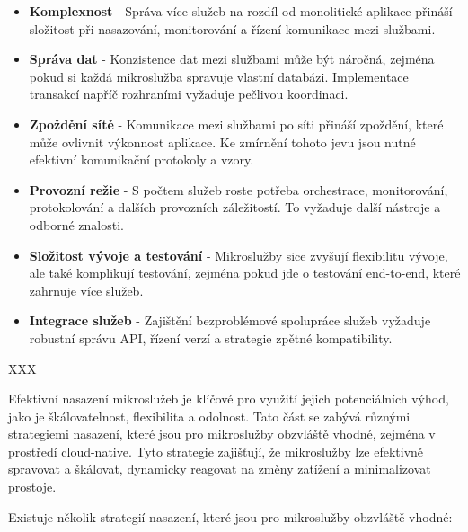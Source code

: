 \begin{itemize}

\item \textbf{Komplexnost} - Správa více služeb na rozdíl od monolitické aplikace přináší složitost při nasazování, monitorování a řízení komunikace mezi službami.

\item \textbf{Správa dat} - Konzistence dat mezi službami může být náročná, zejména pokud si každá mikroslužba spravuje vlastní databázi. Implementace transakcí napříč rozhraními vyžaduje pečlivou koordinaci.

\item \textbf{Zpoždění sítě} - Komunikace mezi službami po síti přináší zpoždění, které může ovlivnit výkonnost aplikace. Ke zmírnění tohoto jevu jsou nutné efektivní komunikační protokoly a vzory.

\item \textbf{Provozní režie} - S počtem služeb roste potřeba orchestrace, monitorování, protokolování a dalších provozních záležitostí. To vyžaduje další nástroje a odborné znalosti.

\item \textbf{Složitost vývoje a testování} - Mikroslužby sice zvyšují flexibilitu vývoje, ale také komplikují testování, zejména pokud jde o testování end-to-end, které zahrnuje více služeb.

\item \textbf{Integrace služeb} - Zajištění bezproblémové spolupráce služeb vyžaduje robustní správu API, řízení verzí a strategie zpětné kompatibility.

\end{itemize}

XXX


Efektivní nasazení mikroslužeb je klíčové pro využití jejich potenciálních výhod, jako je škálovatelnost, flexibilita a odolnost. Tato část se zabývá různými strategiemi nasazení, které jsou pro mikroslužby obzvláště vhodné, zejména v prostředí cloud-native. Tyto strategie zajišťují, že mikroslužby lze efektivně spravovat a škálovat, dynamicky reagovat na změny zatížení a minimalizovat prostoje.


Existuje několik strategií nasazení, které jsou pro mikroslužby obzvláště vhodné:

